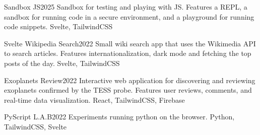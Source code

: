 %
%
%


\begin{projects}
	\project
	{Sandbox JS}{2025}
	{  }
	{Sandbox for testing and playing with JS. Features a REPL, a sandbox for running code in a secure environment, and a playground for running code snippets.}
	{Svelte, TailwindCSS}

	\project
	{Svelte Wikipedia Search}{2022}
	{  }
	{Small wiki search app that uses the Wikimedia API to search articles. Features internationalization, dark mode and fetching the top posts of the day.}
	{Svelte, TailwindCSS}
				
	\project
	{Exoplanets Review}{2022}
	{  }
	{Interactive web application for discovering and reviewing exoplanets confirmed by the TESS probe. Features user reviews, comments, and real-time data visualization.}
	{React, TailwindCSS, Firebase}

    \project
	{PyScript L.A.B}{2022}
	{  }
	{Experiments running python on the browser.}
	{Python, TailwindCSS, Svelte}

\end{projects}